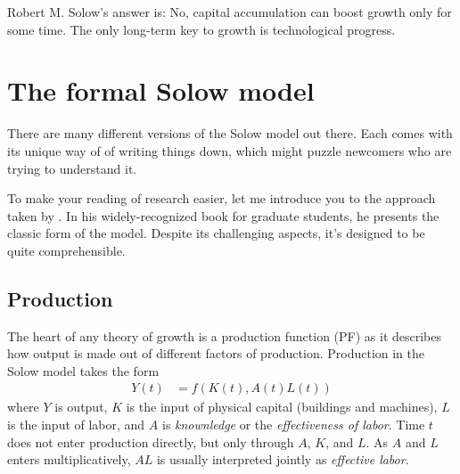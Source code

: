 Robert M. Solow's answer is: No, capital accumulation can boost growth only for some time. The only long-term key to growth is technological progress.





\pbn
\section{The formal Solow model}

There are many different versions of the Solow model out there. Each comes with its unique way of of writing things down, which might puzzle newcomers who are trying to understand it.

To make your reading of research easier, let me introduce you to the approach taken by \citet[p. 5-29]{Romer2006Advanced}. In his widely-recognized book for graduate students, he presents the classic form of the model. Despite its challenging aspects, it's designed to be quite comprehensible. 

\subsection{Production}

The heart of any theory of growth is a production function (PF) as it describes how output is made out of different factors of production. Production
in the Solow model takes the form 
\begin{align}
	Y(t)&=f(K(t), A(t)L(t))
\end{align}
where $Y$ is output, $K$ is the input of physical capital (buildings and machines), $L$ is the input of labor, and $A$ is \textit{knownledge} or the \textit{effectiveness of labor}. Time $t$ does not enter production directly, but only through $A$, $K$, and $L$. As $A$ and $L$ enters multiplicatively, $AL$ is usually interpreted jointly as \textit{effective labor}. 

